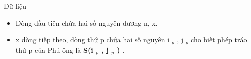 Dữ liệu
\begin{itemize}
	\item Dòng đầu tiên chứa hai số nguyên dương n, x.
	\item x dòng tiếp theo, dòng thứ p chứa hai số nguyên i $_ p $ , j $_ p $ cho biết phép tráo thứ p của Phú ông là \textbf{ S(i $_ p $ , j $_ p $ ) } .
\end{itemize}